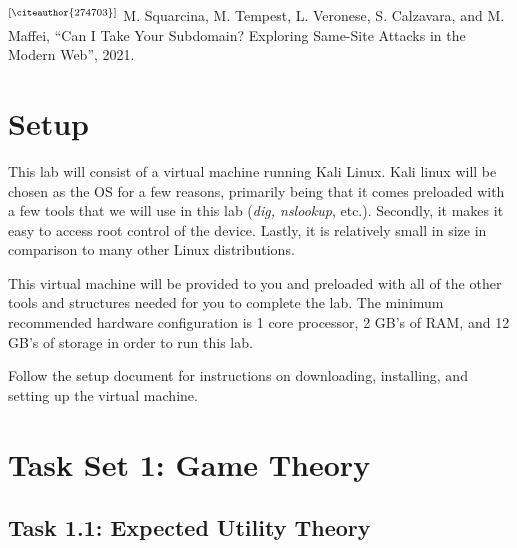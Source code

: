 \documentclass[letterpaper,12pt]{report}
\begin{document}
$^{\text{[\citeauthor{274703}}]}$ M. Squarcina, M. Tempest, L. Veronese, S. Calzavara, and M. Maffei, “Can I Take Your Subdomain? Exploring Same-Site Attacks in the Modern Web”, 2021.


\section*{Setup}\label{sec:Setup}

This lab will consist of a virtual machine running Kali Linux. Kali linux will be chosen as the OS for a few reasons, primarily being that it comes preloaded with a few tools that we will use in this lab (\emph{dig, nslookup}, etc.). Secondly, it makes it easy to access root control of the device. Lastly, it is relatively small in size in comparison to many other Linux distributions.

This virtual machine will be provided to you and preloaded with all of the other tools and structures needed for you to complete the lab. The minimum recommended hardware configuration is 1 core processor, 2 GB’s of RAM, and 12 GB’s of storage in order to run this lab.

Follow the setup document for instructions on downloading, installing, and setting up the virtual machine.


\section*{Task Set 1: Game Theory}\label{sec:Task Set 1: Game Theory}

\subsection*{Task 1.1: Expected Utility Theory}
\end{document}
